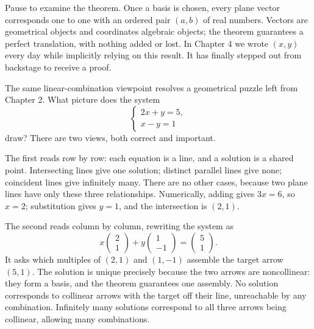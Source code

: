 Pause to examine the theorem. Once a basis is chosen, every plane vector corresponds one to one with an ordered pair $(a,b)$ of real numbers. Vectors are geometrical objects and coordinates algebraic objects; the theorem guarantees a perfect translation, with nothing added or lost. In Chapter 4 we wrote $(x,y)$ every day while implicitly relying on this result. It has finally stepped out from backstage to receive a proof.

The same linear-combination viewpoint resolves a geometrical puzzle left from Chapter 2. What picture does the system
\[
\begin{cases}
2x+y=5,\\
x-y=1
\end{cases}
\]
draw? There are two views, both correct and important.

The first reads row by row: each equation is a line, and a solution is a shared point. Intersecting lines give one solution; distinct parallel lines give none; coincident lines give infinitely many. There are no other cases, because two plane lines have only these three relationships. Numerically, adding gives $3x=6$, so $x=2$; substitution gives $y=1$, and the intersection is $(2,1)$.

\begin{center}
\end{center}

The second reads column by column, rewriting the system as
\[
x\begin{pmatrix}2\\1\end{pmatrix}+y\begin{pmatrix}1\\-1\end{pmatrix}=\begin{pmatrix}5\\1\end{pmatrix}.
\]
It asks which multiples of $(2,1)$ and $(1,-1)$ assemble the target arrow $(5,1)$. The solution is unique precisely because the two arrows are noncollinear: they form a basis, and the theorem guarantees one assembly. No solution corresponds to collinear arrows with the target off their line, unreachable by any combination. Infinitely many solutions correspond to all three arrows being collinear, allowing many combinations.

